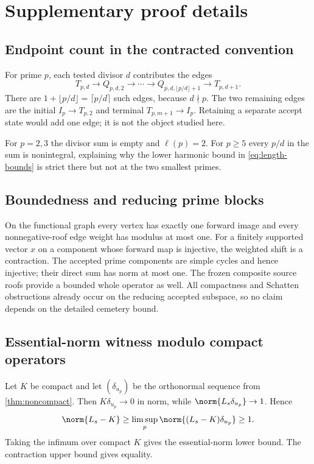 \section{Supplementary proof details}
\label{app:proofs}

\subsection{Endpoint count in the contracted convention}

For prime $p$, each tested divisor $d$ contributes the edges
\[
T_{p,d}\to Q_{p,d,2}\to\cdots\to
Q_{p,d,\lfloor p/d\rfloor+1}\to T_{p,d+1}.
\]
There are $1+\lfloor p/d\rfloor=\lceil p/d\rceil$ such edges, because
$d\nmid p$.  The two remaining edges are the initial
$I_p\to T_{p,2}$ and terminal $T_{p,m+1}\to I_p$.  Retaining a separate
accept state would add one edge; it is not the object studied here.

For $p=2,3$ the divisor sum is empty and $\ell(p)=2$.  For $p\ge5$ every
$p/d$ in the sum is nonintegral, explaining why the lower harmonic bound in
\eqref{eq:length-bounds} is strict there but not at the two smallest primes.

\subsection{Boundedness and reducing prime blocks}

On the functional graph every vertex has exactly one forward image and every
nonnegative-roof edge weight has modulus at most one.  For a finitely
supported vector $x$ on a component whose forward map is injective, the
weighted shift is a contraction.  The accepted prime components are simple
cycles and hence injective; their direct sum has norm at most one.  The frozen
composite source roofs provide a bounded whole operator as well.  All
compactness and Schatten obstructions already occur on the reducing accepted
subspace, so no claim depends on the detailed cemetery bound.

\subsection{Essential-norm witness modulo compact operators}

Let $K$ be compact and let $(\delta_{u_p})$ be the orthonormal sequence from
\cref{thm:noncompact}.  Then
$K\delta_{u_p}\to0$ in norm, while
$\norm{L_s\delta_{u_p}}\to1$.  Hence
\[
\norm{L_s-K}\ge
\limsup_p\norm{(L_s-K)\delta_{u_p}}\ge1.
\]
Taking the infimum over compact $K$ gives the essential-norm lower bound.
The contraction upper bound gives equality.


